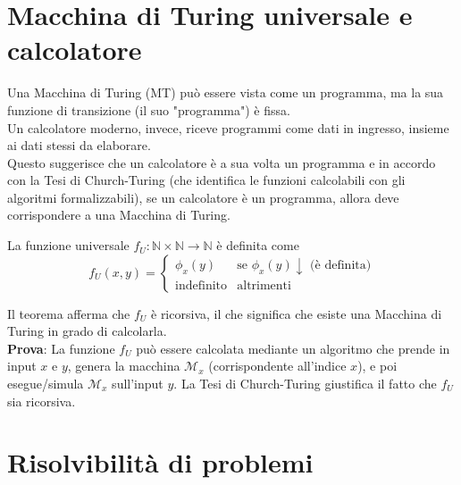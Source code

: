 \documentclass[12pt, a4paper]{report}
\begin{document}
            \section{Macchina di Turing universale e calcolatore}
                Una Macchina di Turing (MT) può essere vista come un programma, ma la sua funzione di transizione (il suo "programma") è fissa.\\
                Un calcolatore moderno, invece, riceve programmi come dati in ingresso, insieme ai dati stessi da elaborare.\\
                Questo suggerisce che un calcolatore è a sua volta un programma e
                in accordo con la Tesi di Church-Turing (che identifica le funzioni calcolabili con gli algoritmi formalizzabili), se un calcolatore è un programma, allora deve corrispondere a una Macchina di Turing.
                \begin{definitionbox}{}{}
                    La funzione universale $f_U:\mathbb{N}\times\mathbb{N}\to\mathbb{N}$ è definita come 
                    $$
                    f_U(x,y)=\begin{cases}
                        \phi_x(y) & \text{se } \phi_x(y)\downarrow \text{ (è definita)}\\
                        \text{indefinito} & \text{altrimenti}
                    \end{cases}
                    $$
                \end{definitionbox}
                Il teorema afferma che $f_U$ è ricorsiva, il che significa che esiste una Macchina di Turing in grado di calcolarla.\\
                \textbf{Prova}: La funzione $f_U$ può essere calcolata mediante un algoritmo che prende in input $x$ e $y$, genera la macchina $\mathcal{M}_x$ (corrispondente all'indice $x$), e poi esegue/simula $\mathcal{M}_x$ sull'input $y$. La Tesi di Church-Turing giustifica il fatto che $f_U$ sia ricorsiva.
            \section{Risolvibilità di problemi}
\end{document}
